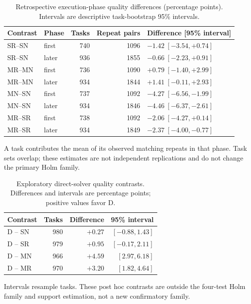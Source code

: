 \documentclass[pdflatex,sn-nature]{scientificreports}
\begin{document}
\FloatBarrier

\begin{table}[!ht]
\caption{Retrospective execution-phase quality differences (percentage points). Intervals are descriptive task-bootstrap 95\% intervals.}
\label{tab:temporal-diagnostics}
\centering\small
\begin{tabular}{@{}llrrl@{}}\toprule
Contrast & Phase & Tasks & Repeat pairs & Difference [95\% interval]\\
\midrule
SR--SN & first & 740 & 1096 & $-1.42\;[-3.54, +0.74]$\\
SR--SN & later & 936 & 1855 & $-0.66\;[-2.23, +0.91]$\\
MR--MN & first & 736 & 1090 & $+0.79\;[-1.40, +2.99]$\\
MR--MN & later & 934 & 1844 & $+1.41\;[-0.11, +2.93]$\\
MN--SN & first & 737 & 1092 & $-4.27\;[-6.56, -1.99]$\\
MN--SN & later & 934 & 1846 & $-4.46\;[-6.37, -2.61]$\\
MR--SR & first & 738 & 1092 & $-2.06\;[-4.27, +0.14]$\\
MR--SR & later & 934 & 1849 & $-2.37\;[-4.00, -0.77]$\\
\bottomrule\end{tabular}
\par\smallskip\noindent A task contributes the mean of its observed matching repeats in that phase. Task sets overlap; these estimates are not independent replications and do not change the primary Holm family.
\end{table}

\FloatBarrier

\begin{table}[!ht]
\caption{Exploratory direct-solver quality contrasts. Differences and intervals are percentage points; positive values favor D.}
\label{tab:direct-contrasts}
\centering\small
\begin{tabular}{@{}lrrr@{}}
\toprule
Contrast & Tasks & Difference & 95\% interval\\
\midrule
D -- SN & 980 & $+0.27$ & $[-0.88, 1.43]$\\
D -- SR & 979 & $+0.95$ & $[-0.17, 2.11]$\\
D -- MN & 966 & $+4.59$ & $[2.97, 6.18]$\\
D -- MR & 970 & $+3.20$ & $[1.82, 4.64]$\\
\bottomrule
\end{tabular}
\par\smallskip\noindent Intervals resample tasks. These post hoc contrasts are outside the four-test Holm family and support estimation, not a new confirmatory family.
\end{table}
\end{document}
